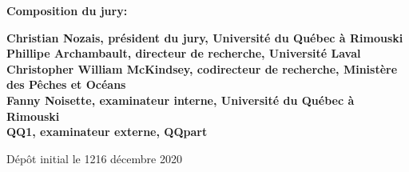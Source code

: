 \thispagestyle{empty}

\null
\vfill
\noindent \textbf{Composition du jury:}\\
\vspace{1cm}

\begin{singlespace}
  \noindent \textbf{Christian Nozais, président du jury, Université du Québec à Rimouski}\\

  \noindent \textbf{Phillipe Archambault, directeur de recherche, Université Laval}\\

  \noindent \textbf{Christopher William McKindsey, codirecteur de recherche, Ministère des Pêches et Océans}\\

  \noindent \textbf{Fanny Noisette, examinateur interne, Université du Québec à Rimouski}\\

  \noindent \textbf{QQ1, examinateur externe, QQpart}\\
\end{singlespace}

\vspace{2cm}
\noindent Dépôt initial le 1216 décembre 2020
\hspace{3cm}


\cleardoublepage

